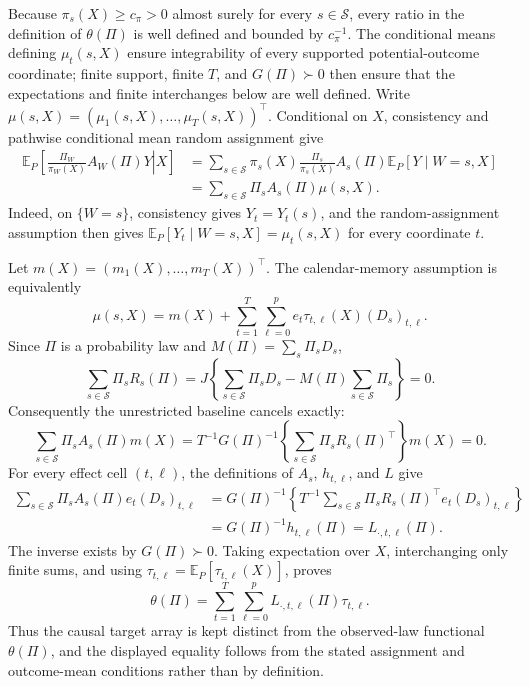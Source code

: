 Because \(\pi_s(X)\geq c_{\pi}>0\) almost surely for every \(s\in\mathcal S\), every ratio in the definition of \(\theta(\Pi)\) is well defined and bounded by \(c_{\pi}^{-1}\).  The conditional means defining \(\mu_t(s,X)\) ensure integrability of every supported potential-outcome coordinate; finite support, finite \(T\), and \(G(\Pi)\succ0\) then ensure that the expectations and finite interchanges below are well defined.  Write \(\mu(s,X)=(\mu_1(s,X),\ldots,\mu_T(s,X))^{\top}\).  Conditional on \(X\), consistency and pathwise conditional mean random assignment give
\[
\begin{aligned}
\mathbb E_P\!\left[\left.\frac{\Pi_W}{\pi_W(X)}A_W(\Pi)Y\right|X\right]
&=\sum_{s\in\mathcal S}\pi_s(X)\frac{\Pi_s}{\pi_s(X)}A_s(\Pi)
  \mathbb E_P[Y\mid W=s,X]\\
&=\sum_{s\in\mathcal S}\Pi_sA_s(\Pi)\mu(s,X).
\end{aligned}
\]
Indeed, on \(\{W=s\}\), consistency gives \(Y_t=Y_t(s)\), and the random-assignment assumption then gives \(\mathbb E_P[Y_t\mid W=s,X]=\mu_t(s,X)\) for every coordinate \(t\).

Let \(m(X)=(m_1(X),\ldots,m_T(X))^{\top}\).  The calendar-memory assumption is equivalently
\[
 \mu(s,X)=m(X)+\sum_{t=1}^{T}\sum_{\ell=0}^{p}
 e_t\tau_{t,\ell}(X)(D_s)_{t,\ell}.
\]
Since \(\Pi\) is a probability law and \(M(\Pi)=\sum_s\Pi_sD_s\),
\[
 \sum_{s\in\mathcal S}\Pi_sR_s(\Pi)
 =J\left\{\sum_{s\in\mathcal S}\Pi_sD_s-M(\Pi)\sum_{s\in\mathcal S}\Pi_s\right\}=0.
\]
Consequently the unrestricted baseline cancels exactly:
\[
 \sum_{s\in\mathcal S}\Pi_sA_s(\Pi)m(X)
 =T^{-1}G(\Pi)^{-1}
   \left\{\sum_{s\in\mathcal S}\Pi_sR_s(\Pi)^{\top}\right\}m(X)=0.
\]
For every effect cell \((t,\ell)\), the definitions of \(A_s\), \(h_{t,\ell}\), and \(L\) give
\[
\begin{aligned}
 \sum_{s\in\mathcal S}\Pi_sA_s(\Pi)e_t(D_s)_{t,\ell}
 &=G(\Pi)^{-1}\left\{T^{-1}\sum_{s\in\mathcal S}
   \Pi_sR_s(\Pi)^{\top}e_t(D_s)_{t,\ell}\right\}\\
 &=G(\Pi)^{-1}h_{t,\ell}(\Pi)
 =L_{\cdot,t,\ell}(\Pi).
\end{aligned}
\]
The inverse exists by \(G(\Pi)\succ0\).  Taking expectation over \(X\), interchanging only finite sums, and using \(\tau_{t,\ell}=\mathbb E_P[\tau_{t,\ell}(X)]\), proves
\[
 \theta(\Pi)=\sum_{t=1}^{T}\sum_{\ell=0}^{p}
 L_{\cdot,t,\ell}(\Pi)\tau_{t,\ell}.
\]
Thus the causal target array is kept distinct from the observed-law functional \(\theta(\Pi)\), and the displayed equality follows from the stated assignment and outcome-mean conditions rather than by definition.

